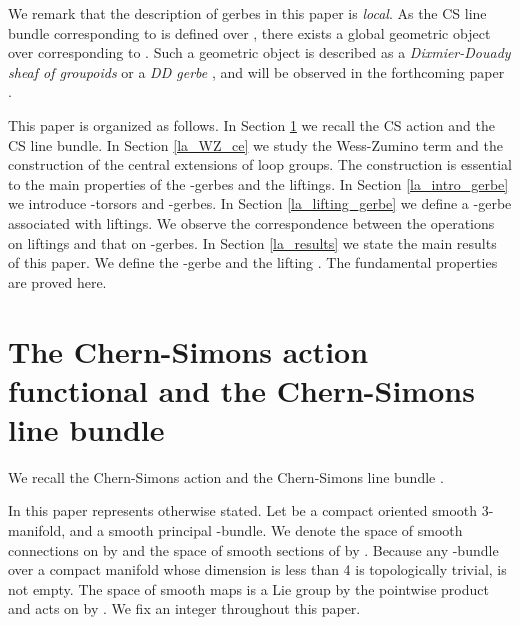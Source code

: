 \documentclass[a4paper,a4paper]{article}
\theoremstyle{definition}
\theoremstyle{remark}
\providecommand{\T}{\mathbb{T}}
\providecommand{\A}{\mathcal{A}}
\providecommand{\B}{\mathcal{B}}
\providecommand{\G}{\mathcal{G}}
\renewcommand{\S}{\mathcal{S}}
\def\h#1{ \widehat{#1} }
\def\M#1{ \mathrm{Map}({#1},G) }
\begin{document}
We remark that the description of gerbes in this paper is \textit{local}. As the CS line bundle corresponding to \coordHE{} is defined over \myHighlight{$\A_Q$}\coordHE{}, there exists a global geometric object over \myHighlight{$\A_R$}\coordHE{} corresponding to \myHighlight{$\B_R(a)$}\coordHE{}. Such a geometric object is described as a \textit{Dixmier-Douady sheaf of groupoids} or a \textit{DD gerbe} \cite{Br1,Br2}, and will be observed in the forthcoming paper \cite{Go}.

\medskip

This paper is organized as follows. In Section \ref{la_CSaction_CSlinebundle} we recall the CS action and the CS line bundle. In Section \ref{la_WZ_ce} we study the Wess-Zumino term and the construction of the central extensions of loop groups. The construction is essential to the main properties of the \myHighlight{$\T$}\coordHE{}-gerbes and the liftings. In Section \ref{la_intro_gerbe} we introduce \myHighlight{$\T$}\coordHE{}-torsors and \myHighlight{$\T$}\coordHE{}-gerbes. In Section \ref{la_lifting_gerbe} we define a \myHighlight{$\T$}\coordHE{}-gerbe associated with liftings. We observe the correspondence between the operations on liftings and that on \myHighlight{$\T$}\coordHE{}-gerbes. In Section \ref{la_results} we state the main results of this paper. We define the \myHighlight{$\T$}\coordHE{}-gerbe \myHighlight{$\B_R(a)$}\coordHE{} and the lifting \myHighlight{$\h{B}_Q(A)$}\coordHE{}. The fundamental properties are proved here.



\section{The Chern-Simons action functional and the Chern-Simons line bundle}
\label{la_CSaction_CSlinebundle}

We recall the Chern-Simons action and the Chern-Simons line bundle \cite{F1, R-S-W, W}. 

\smallskip

In this paper \coordHE{} represents \coordHE{} otherwise stated. Let \coordHE{} be a compact oriented smooth 3-manifold, and \coordHE{} a smooth principal \coordHE{}-bundle. We denote the space of smooth connections on \coordHE{} by \myHighlight{$\A_P$}\coordHE{} and the space of smooth sections of \coordHE{} by \myHighlight{$\S_P$}\coordHE{}. Because any \coordHE{}-bundle over a compact manifold whose dimension is less than 4 is topologically trivial, \myHighlight{$\S_P$}\coordHE{} is not empty. The space of smooth maps \myHighlight{$\G_M = \M{M}$}\coordHE{} is a Lie group by the pointwise product and acts on \myHighlight{$\S_P$}\coordHE{} by \coordHE{}. We fix an integer \coordHE{} throughout this paper.
\end{document}
